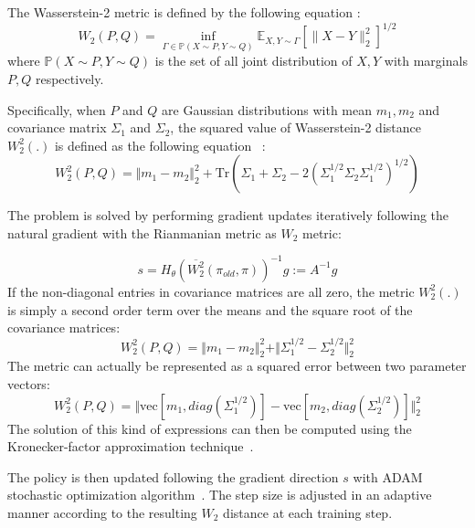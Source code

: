 The Wasserstein-2 metric is defined by the following equation \cite{villani2003topics}:
\begin{equation}
    W_2(P,Q) = 
    \inf_{\Gamma \in \mathbb{P}(X \sim P, Y \sim Q)}
    \mathbb{E}_{X,Y \sim \Gamma} \left[ \lVert X-Y \rVert_2^2 \right]^{1/2}
\end{equation}
where $\mathbb{P}(X \sim P, Y \sim Q)$ is the set of all joint distribution of $X,Y$ with marginals $P,Q$ respectively.

Specifically, when $P$ and $Q$ are Gaussian distributions with mean $m_1,m_2$ and covariance matrix $\Sigma_1$ and $\Sigma_2$, the squared value of Wasserstein-2 distance $W_2^2(.)$ is defined as the following equation~\cite{chafai} :
\begin{equation}
    W_2^2(P,Q) = \Vert m_1-m_2\Vert_2^2 +\mathrm{Tr}\left(\Sigma_1+\Sigma_2-2(\Sigma_1^{1/2}\Sigma_2\Sigma_1^{1/2})^{1/2}\right)
\end{equation}

The problem is solved by performing gradient updates iteratively following the natural gradient with the Rianmanian metric as $W_2$ metric:

\begin{equation}
    s=H_\theta\left( \overline{W_2^2}(\pi_{old},\pi) \right)^{-1}g := A^{-1}g
\end{equation}
%
%
If the non-diagonal entries in covariance matrices are all zero, the metric $W_2^2(.)$ is simply a second order term over the means and the square root of the covariance matrices:
\begin{equation}
W_2^2(P,Q) = \Vert m_1-m_2\Vert_2^2 +\Vert \Sigma_1^{1/2}-\Sigma_2^{1/2}\Vert_2^2
\end{equation}
The metric can actually be represented as a squared error between two parameter vectors:
\begin{equation}
W_2^2(P,Q) = \Vert \text{vec}[m_1,diag(\Sigma_1^{1/2})]-\text{vec}[m_2,diag(\Sigma_2^{1/2})]\Vert_2^2 
\end{equation}
The solution of this kind of expressions can then be computed using the Kronecker-factor approximation technique~\cite{wu2017scalable}.

The policy is then updated following the gradient direction $s$ with ADAM stochastic optimization algorithm~\cite{kingma2014adam}. The step size is adjusted in an adaptive manner according to the resulting $W_2$ distance at each training step.